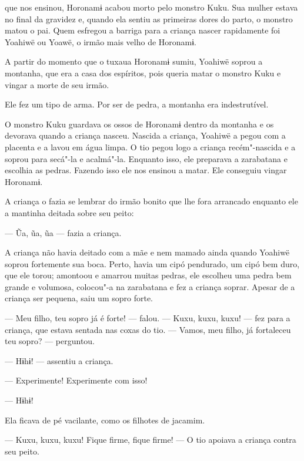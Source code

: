 
 que nos ensinou, Horonamɨ acabou morto pelo monstro Kuku.
Sua mulher estava no final da gravidez e, quando ela sentiu as primeiras
dores do parto, o monstro matou o pai. Quem esfregou a barriga para a
criança nascer rapidamente foi Yoahiwë ou Yoawë, o irmão mais velho de
Horonamɨ. 

A partir do momento que o tuxaua Horonamɨ sumiu, Yoahiwë soprou a
montanha, que era a casa dos espíritos, pois queria matar o monstro Kuku
e vingar a morte de seu irmão. 

Ele fez um tipo de arma. Por ser de pedra, a montanha era
indestrutível. 

O monstro Kuku guardava os ossos de Horonamɨ dentro da montanha e os
devorava quando a criança nasceu. Nascida a criança, Yoahiwë a pegou com
a placenta e a lavou em água limpa. O tio pegou logo a criança
recém"-nascida e a soprou para secá"-la e acalmá"-la. Enquanto isso, ele
preparava a zarabatana e escolhia as pedras. Fazendo isso ele nos
ensinou a matar. Ele conseguiu vingar Horonamɨ. 

A criança o fazia se lembrar do irmão bonito que lhe fora arrancado
enquanto ele a mantinha deitada sobre seu peito:

--- Ũa, ũa, ũa --- fazia a criança. 

A criança não havia deitado com a mãe e nem mamado ainda quando Yoahiwë
soprou fortemente sua boca. Perto, havia um cipó pendurado, um cipó bem
duro, que ele torou; amontoou e amarrou muitas pedras, ele escolheu uma
pedra bem grande e volumosa, colocou"-a na zarabatana e fez a criança
soprar. Apesar de a criança ser pequena, saiu um sopro forte. 

--- Meu filho, teu sopro já é forte! --- falou. --- Kuxu, kuxu,
kuxu! --- fez para a criança, que estava sentada nas coxas do
tio. --- Vamos, meu filho, já fortaleceu teu sopro? --- perguntou.

--- Hɨhɨ! --- assentiu a criança. 

--- Experimente! Experimente com isso! 

--- Hɨhɨ! 

Ela ficava de pé vacilante, como os filhotes de jacamim. 

--- Kuxu, kuxu, kuxu! Fique firme, fique firme! --- O tio apoiava a
criança contra seu peito. 

